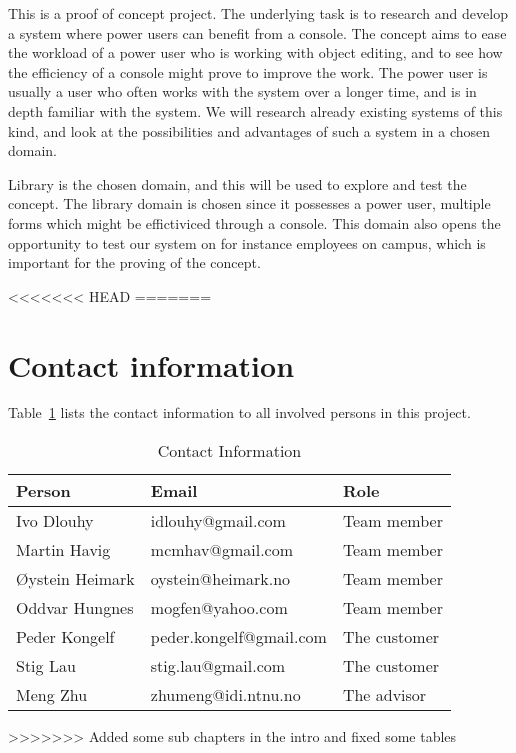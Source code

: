 This is a proof of concept project. The underlying task is to research and develop a system where power users can benefit from a console.  The concept aims to ease the workload of a power user who is working with object editing, and to see how the efficiency of a console might prove to improve the work. The power user is usually a user who often works with the system over a longer time, and is in depth familiar with the system. We will research already existing systems of this kind, and look at the possibilities and advantages of such a system in a chosen domain.

Library is the chosen domain, and this will be used to explore and test the concept. The library domain is chosen since it possesses a power user, multiple forms which might be effictiviced through a console. This domain also opens the opportunity to test our system on for instance employees on campus, which is important for the proving of the concept.

<<<<<<< HEAD
=======
\section{Contact information}
Table~\ref{table:contactinfo} lists the contact information to all involved persons in this project.
\begin{table}
\caption{Contact Information}
\centering
\begin{tabular}{  l  l  l  }
\hline
Person		&Email		&Role \\ 
\hline
Ivo Dlouhy & idlouhy@gmail.com & Team member \\ 
Martin Havig & mcmhav@gmail.com & Team member \\
Øystein Heimark & oystein@heimark.no & Team member \\
Oddvar Hungnes & mogfen@yahoo.com & Team member \\
Peder Kongelf & peder.kongelf@gmail.com & The customer \\
Stig Lau & stig.lau@gmail.com & The customer \\
Meng Zhu & zhumeng@idi.ntnu.no & The advisor \\ 
\hline
\end{tabular}
\label{table:contactinfo}
\end{table}
>>>>>>> Added some sub chapters in the intro and fixed some tables

